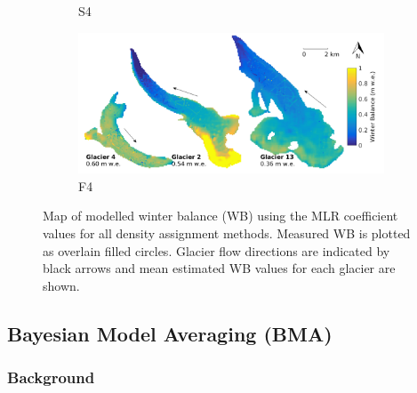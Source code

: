 \documentclass{sfuthesis}
\begin{document}
\begin{figure}
\begin{subfigure}[b]{0.475\textwidth}
            \caption[]%
            {{\small S4}}    
        \end{subfigure}
        \quad
        \begin{subfigure}[b]{0.475\textwidth}   
            \centering 
            \includegraphics[width=\textwidth]{MLRmap_Modelled_Observed8.png}
            \caption[]%
            {{\small F4}}    
        \end{subfigure}
        
        \caption[Map of modelled winter balance (WB) using the MLR coefficient values for all density assignment methods. Measured WB is plotted as overlain filled circles. Glacier flow directions are indicated by black arrows and mean estimated WB values for each glacier are shown.]
        {\small Map of modelled winter balance (WB) using the MLR coefficient values for all density assignment methods. Measured WB is plotted as overlain filled circles. Glacier flow directions are indicated by black arrows and mean estimated WB values for each glacier are shown.} 
        \label{fig:allMLRmodelled}
    \end{figure}
    



\subsection{Bayesian Model Averaging (BMA)}
\label{sec:BMS}

\subsubsection{Background}
\end{document}
